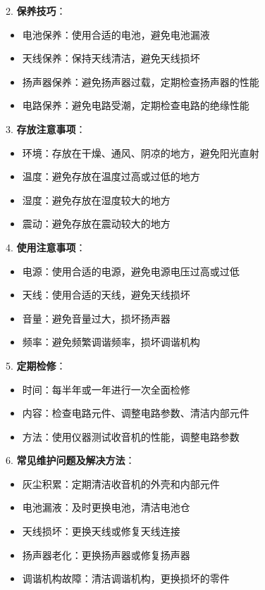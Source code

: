 \documentclass[12pt,UTF8]{ctexbook}
\begin{document}
2. \textbf{保养技巧}：
   \begin{itemize}[leftmargin=3.5em]
   \item 电池保养：使用合适的电池，避免电池漏液
   \item 天线保养：保持天线清洁，避免天线损坏
   \item 扬声器保养：避免扬声器过载，定期检查扬声器的性能
   \item 电路保养：避免电路受潮，定期检查电路的绝缘性能
   \end{itemize}

3. \textbf{存放注意事项}：
   \begin{itemize}[leftmargin=3.5em]
   \item 环境：存放在干燥、通风、阴凉的地方，避免阳光直射
   \item 温度：避免存放在温度过高或过低的地方
   \item 湿度：避免存放在湿度较大的地方
   \item 震动：避免存放在震动较大的地方
   \end{itemize}

4. \textbf{使用注意事项}：
   \begin{itemize}[leftmargin=3.5em]
   \item 电源：使用合适的电源，避免电源电压过高或过低
   \item 天线：使用合适的天线，避免天线损坏
   \item 音量：避免音量过大，损坏扬声器
   \item 频率：避免频繁调谐频率，损坏调谐机构
   \end{itemize}

5. \textbf{定期检修}：
   \begin{itemize}[leftmargin=3.5em]
   \item 时间：每半年或一年进行一次全面检修
   \item 内容：检查电路元件、调整电路参数、清洁内部元件
   \item 方法：使用仪器测试收音机的性能，调整电路参数
   \end{itemize}

6. \textbf{常见维护问题及解决方法}：
   \begin{itemize}[leftmargin=3.5em]
   \item 灰尘积累：定期清洁收音机的外壳和内部元件
   \item 电池漏液：及时更换电池，清洁电池仓
   \item 天线损坏：更换天线或修复天线连接
   \item 扬声器老化：更换扬声器或修复扬声器
   \item 调谐机构故障：清洁调谐机构，更换损坏的零件
   \end{itemize}
\end{document}
